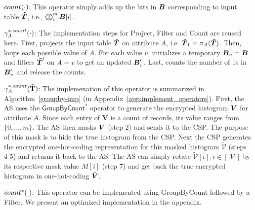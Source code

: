  $count(\cdot)$:  This operator simply  adds up the bits in $\boldsymbol{B}$ corresponding to input table $\boldsymbol{\tilde{T}}$, i.e., $\bigoplus_{i}^m \boldsymbol{B}[i]$.

 $\gamma^{*,count}_{A}(\cdot)$: The implementation steps for \textsf{Project}, \textsf{Filter} and \textsf{Count} are reused here. First, \system projects the input table $\boldsymbol{\tilde{T}}$ on attribute $A$, i.e. $\boldsymbol{\tilde{T}}_1 = \pi_A(\boldsymbol{\tilde{T}})$. Then, \system loops each possible value of $A$. For each value $v$, \system initializes a temporary $\boldsymbol{B}_v=\boldsymbol{B}$ and filters $\boldsymbol{\tilde{T}}'$ on $A=v$ to get an updated $\boldsymbol{B}'_v$. Last, \system counts the number of 1s in $\boldsymbol{B}'_v$ and release the counts. 

 $\gamma^{*,count}_A(\mathbf{\tilde{T}})$: The implemenation of this operator is summarized in Algorithm~\ref{groupby-imp} (in Appendix~\ref{app:implement_operators}). First, the \textsf{AS} uses the $\textsf{GroupByCount}^*$ operator to generate the encrypted histogram $\boldsymbol{V}$ for attribute $A$. Since each entry of $\mathbf{V}$ is a count of records, its value ranges from $\{0,...,m\}$. The \textsf{AS} then masks $\boldsymbol{V}$ (step 2) and sends it to the \textsf{CSP}. The purpose of this mask is to hide the true histogram from the \textsf{CSP}. Next the \textsf{CSP} generates the encrypted one-hot-coding representation for this masked histogram $\boldsymbol{\tilde{\mathcal{V}}}$ (steps 4-5) and returns it back to the \textsf{AS}. %
The \textsf{AS} can simply rotate $\boldsymbol{\tilde{\mathcal{V}}}[i], i \in [|V|]$ by its respective mask value $M[i]$ (step 7) and get back the true encrypted histogram in one-hot-coding $\tilde{\boldsymbol{V}}$.

  $count^*(\cdot)$: This operator can be implemented using \textsf{GroupByCount} followed by a \textsf{Filter}. We present an optimized implementation in the appendix.





